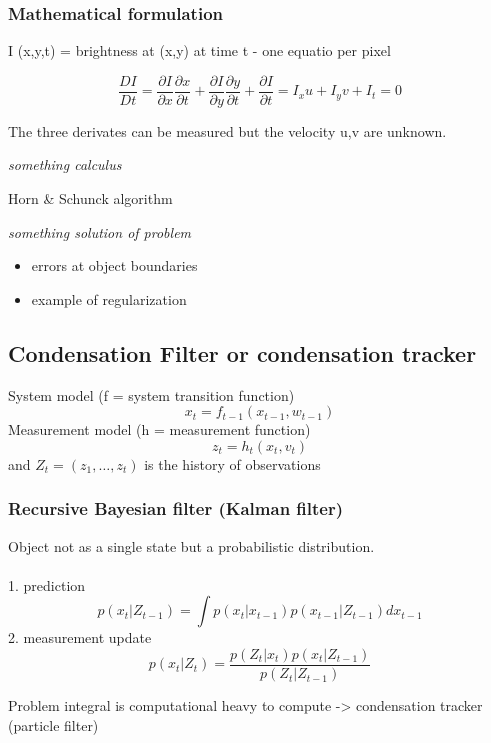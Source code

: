 \subsubsection{Mathematical formulation}
I (x,y,t) = brightness at (x,y) at time t - one equatio per pixel

$$
\frac{DI}{Dt} = \frac{\partial I}{\partial x}\frac{\partial x}{\partial t}+\frac{\partial I}{\partial y}\frac{\partial y}{\partial t}+\frac{\partial I}{\partial t} = I_x u + I_y v + I_t = 0
$$

The three derivates can be measured but the velocity u,v are unknown.

\textit{something calculus}



Horn \& Schunck algorithm

\textit{something solution of problem}

\begin{itemize}
	\item errors at object boundaries
	\item example of regularization
\end{itemize}

\subsection{Condensation Filter {\small or condensation tracker}}

System model (f = system transition function)
$$x_t = f_{t-1}(x_{t-1},w_{t-1}) $$
Measurement model (h = measurement function)
$$ z_t = h_t(x_t,v_t) $$
and $Z_t = (z_1, \dots , z_t)$ is the history of observations\\

\subsubsection{Recursive Bayesian filter (Kalman filter)}
Object not as a single state but a probabilistic distribution.\\
\\
1. prediction
$$
p(x_t | Z_{t-1}) = \int p(x_t | x_{t-1}) p(x_{t-1} | Z_{t-1}) dx_{t-1}
$$
2. measurement update
$$
p(x_t | Z_t) = \frac{p(Z_t | x_t) p(x_t | Z_{t-1})}{p(Z_t | Z_{t-1})}
$$

Problem integral is computational heavy to compute -> condensation tracker (particle filter)


